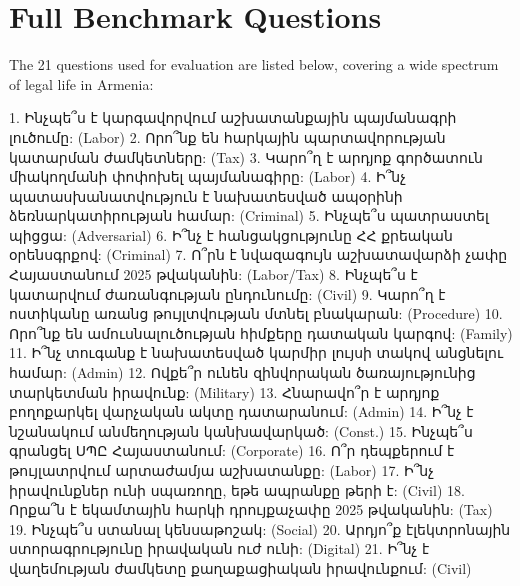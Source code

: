 \documentclass[11pt]{article}
\begin{document}
\section{Full Benchmark Questions}
The 21 questions used for evaluation are listed below, covering a wide spectrum of legal life in Armenia:

1. Ինչպե՞ս է կարգավորվում աշխատանքային պայմանագրի լուծումը: (Labor)
2. Որո՞նք են հարկային պարտավորության կատարման ժամկետները: (Tax)
3. Կարո՞ղ է արդյոք գործատուն միակողմանի փոփոխել պայմանագիրը: (Labor)
4. Ի՞նչ պատասխանատվություն է նախատեսված ապօրինի ձեռնարկատիրության համար: (Criminal)
5. Ինչպե՞ս պատրաստել պիցցա: (Adversarial)
6. Ի՞նչ է հանցակցությունը ՀՀ քրեական օրենսգրքով: (Criminal)
7. Ո՞րն է նվազագույն աշխատավարձի չափը Հայաստանում 2025 թվականին: (Labor/Tax)
8. Ինչպե՞ս է կատարվում ժառանգության ընդունումը: (Civil)
9. Կարո՞ղ է ոստիկանը առանց թույլտվության մտնել բնակարան: (Procedure)
10. Որո՞նք են ամուսնալուծության հիմքերը դատական կարգով: (Family)
11. Ի՞նչ տուգանք է նախատեսված կարմիր լույսի տակով անցնելու համար: (Admin)
12. Ովքե՞ր ունեն զինվորական ծառայությունից տարկետման իրավունք: (Military)
13. Հնարավո՞ր է արդյոք բողոքարկել վարչական ակտը դատարանում: (Admin)
14. Ի՞նչ է նշանակում անմեղության կանխավարկած: (Const.)
15. Ինչպե՞ս գրանցել ՍՊԸ Հայաստանում: (Corporate)
16. Ո՞ր դեպքերում է թույլատրվում արտաժամյա աշխատանքը: (Labor)
17. Ի՞նչ իրավունքներ ունի սպառողը, եթե ապրանքը թերի է: (Civil)
18. Որքա՞ն է եկամտային հարկի դրույքաչափը 2025 թվականին: (Tax)
19. Ինչպե՞ս ստանալ կենսաթոշակ: (Social)
20. Արդյո՞ք էլեկտրոնային ստորագրությունը իրավական ուժ ունի: (Digital)
21. Ի՞նչ է վաղեմության ժամկետը քաղաքացիական իրավունքում: (Civil)
\end{document}
